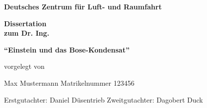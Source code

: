 
\begin{titlepage}
\textbf{\large Deutsches Zentrum für Luft- und Raumfahrt}\vspace*{5cm}

\begin{center}
\huge \textbf{Dissertation} \\  \textbf{zum Dr. Ing.} 
\end{center}\vspace*{-1cm}

\begin{center}
\huge \textbf{\enquote{Einstein und das Bose-Kondensat}}
\end{center}\vspace*{5cm}


vorgelegt von 

Max Mustermann \newline Matrikelnummer 123456

\vfill
Erstgutachter: Daniel Düsentrieb \newline
Zweitgutachter: Dagobert Duck

\end{titlepage}